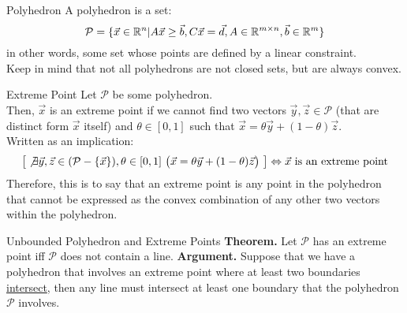 \begin{ln-define}{Polyhedron}{}
    A polyhedron is a set:
    \[
        \mathcal{P} = 
        \{
            \vec{x} \in \mathbb{R}^n | A \vec{x} \geq \vec{b}, C \vec{x} = \vec{d}, A \in \mathbb{R}^{m \times n}, \vec{b} \in \mathbb{R}^m
        \}
    \]
    in other words, some set whose points are defined by a linear constraint. \\
    Keep in mind that not all polyhedrons are not closed sets, but are always convex.
\end{ln-define}
\begin{ln-define}{Extreme Point}{}
    Let $\mathcal{P}$ be some polyhedron. \\
    Then, $\vec{x}$ is an extreme point if we cannot find two vectors $\vec{y}, \vec{z} \in \mathcal{P}$ (that are distinct form $\vec{x}$ itself) and $\theta \in [0, 1]$ such that $\vec{x} = \theta \vec{y} + (1 - \theta) \vec{z}$. \\
    Written as an implication:
    \[
        \big[\not\exists \vec{y}, \vec{z} \in (\mathcal{P} - \{\vec{x}\}), \theta \in [0, 1]\ \big(\vec{x} = \theta \vec{y} + (1 - \theta) \vec{z} \big)\ \big] \Leftrightarrow \vec{x} \text{ is an extreme point}
    \]
    Therefore, this is to say that an extreme point is any point in the polyhedron that cannot be expressed as the convex combination of any other two vectors within the polyhedron.
\end{ln-define}
\begin{ln-theorem}{Unbounded Polyhedron and Extreme Points}{}
    \textbf{Theorem.}
    Let $\mathcal{P}$ has an extreme point iff $\mathcal{P}$ does not contain a line.
    \tcblower
    \textbf{Argument.}
    Suppose that we have a polyhedron that involves an extreme point where at least two boundaries \underline{intersect}, then any line must intersect at least one boundary that the polyhedron $\mathcal{P}$ involves.
\end{ln-theorem}
